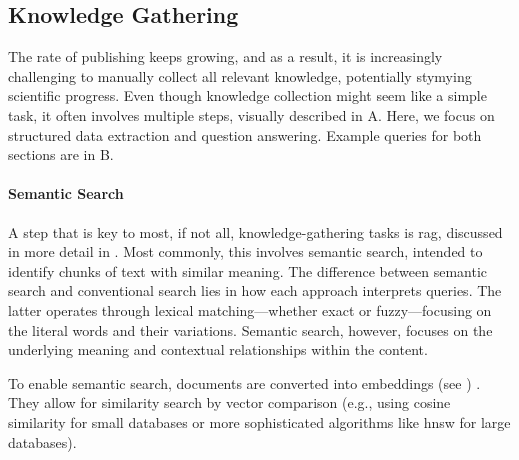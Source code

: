 

\subsection{Knowledge Gathering}\label{sec:information_gathering}
The rate of publishing keeps growing, and as a result, it is increasingly challenging to manually collect all relevant knowledge, potentially stymying scientific progress.\autocite{schilling2025text, Chu_2021}
Even though knowledge collection might seem like a simple task, it often involves multiple steps, visually described in A. 
Here, we focus on structured data extraction and question answering. Example queries for both sections are in B.


\paragraph{Semantic Search} A step that is key to most, if not all, knowledge-gathering tasks is \gls{rag}, discussed in more detail in . 
Most commonly, this involves semantic search, intended to identify chunks of text with similar meaning. 
The difference between semantic search and conventional search lies in how each approach interprets queries. The latter operates through lexical matching---whether exact or fuzzy---focusing on the literal words and their variations. Semantic search, however, focuses on the underlying meaning and contextual relationships within the content. 

To enable semantic search, documents are converted into embeddings (see ) \autocite{bojanowski2017enriching}. 
They allow for similarity search by vector comparison (e.g., using cosine similarity for small databases or more sophisticated algorithms like \gls{hnsw} for large databases\autocite{malkov2018efficient}). 

